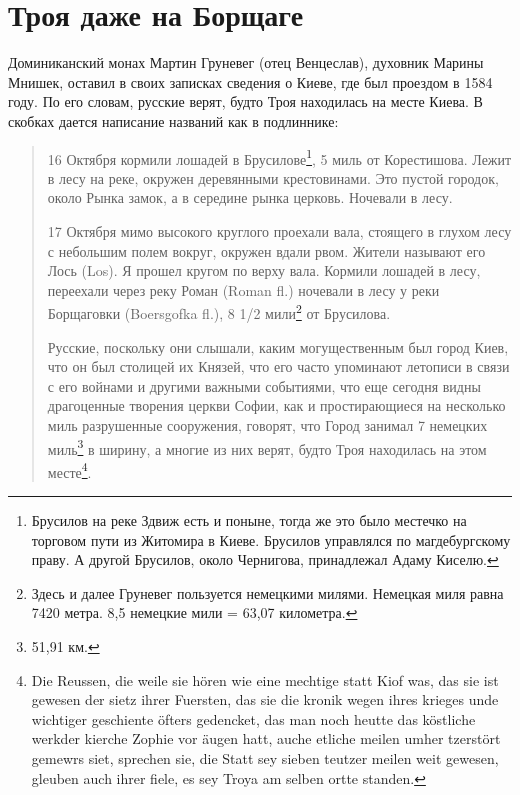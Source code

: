 \chapter{Троя даже на Борщаге}

Доминиканский монах Мартин Груневег (отец Венцеслав), духовник Марины Мнишек, оставил в своих записках\cite{gruneveg} сведения о Киеве, где был проездом в 1584 году. По его словам, русские верят, будто Троя находилась на месте Киева. В скобках дается написание названий как в подлиннике:

\begin{quotation}
16 Октября кормили лошадей в Брусилове\footnote{Брусилов на реке Здвиж есть и поныне, тогда же это было местечко на торговом пути из Житомира в Киеве. Брусилов управлялся по магдебургскому праву. А другой Брусилов, около Чернигова, принадлежал Адаму Киселю.}, 5 миль от Корестишова. Лежит в лесу на реке, окружен деревянными крестовинами. Это пустой городок, около Рынка замок, а в середине рынка церковь. Ночевали в лесу.

17 Октября мимо высокого круглого проехали вала, стоящего в глухом лесу с небольшим полем вокруг, окружен вдали рвом. Жители называют его Лось (Los). Я прошел кругом по верху вала. Кормили лошадей в лесу, переехали через реку Роман (Roman fl.) ночевали в лесу у реки Борщаговки (Boersgofka fl.), 8 1/2 мили\footnote{Здесь и далее Груневег пользуется немецкими милями. Немецкая миля равна 7420 метра. 8,5 немецкие мили = 63,07 километра.} от Брусилова.

Русские, поскольку они слышали, каким могущественным был город Киев, что он был столицей их Князей, что его часто упоминают летописи в связи с его войнами и другими важными событиями, что еще сегодня видны драгоценные творения церкви Софии, как и простирающиеся на несколько миль разрушенные сооружения, говорят, что Город занимал 7 немецких миль\footnote{51,91 км.} в ширину, а многие из них верят, будто Троя находилась на этом месте\footnote{Die Reussen, die weile sie hören wie eine mechtige statt Kiof was, das sie ist gewesen der sietz ihrer Fuersten, das sie die kronik wegen ihres krieges unde wichtiger geschiente öfters gedencket, das man noch heutte das köstliche werkder kierche Zophie vor äugen hatt, auche etliche meilen umher tzerstört gemewrs siet, sprechen sie, die Statt sey sieben teutzer meilen weit gewesen, gleuben auch ihrer fiele, es sey Troya am selben ortte standen.}.


\end{quotation}

